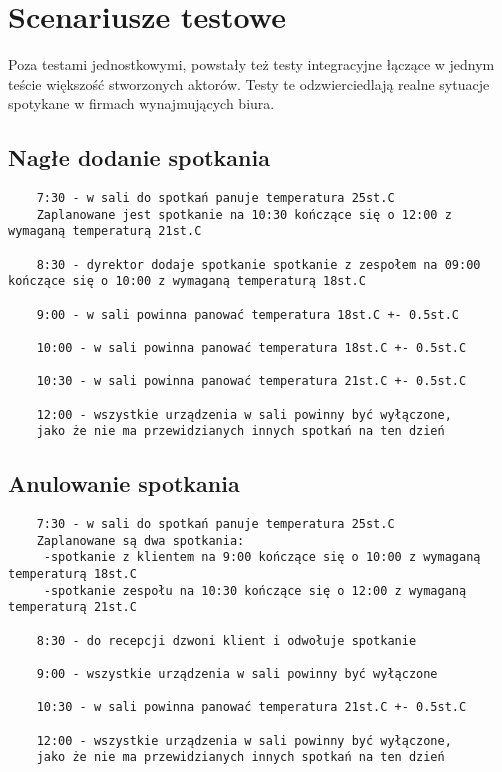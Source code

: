\section{Scenariusze testowe}
Poza testami jednostkowymi, powstały też testy integracyjne łączące w jednym teście większość stworzonych aktorów. Testy te odzwierciedlają realne sytuacje spotykane w firmach wynajmujących biura. 

\subsection{Nagłe dodanie spotkania}
\begin{lstlisting}
    7:30 - w sali do spotkań panuje temperatura 25st.C
    Zaplanowane jest spotkanie na 10:30 kończące się o 12:00 z wymaganą temperaturą 21st.C
    
    8:30 - dyrektor dodaje spotkanie spotkanie z zespołem na 09:00 kończące się o 10:00 z wymaganą temperaturą 18st.C

    9:00 - w sali powinna panować temperatura 18st.C +- 0.5st.C
    
    10:00 - w sali powinna panować temperatura 18st.C +- 0.5st.C
    
    10:30 - w sali powinna panować temperatura 21st.C +- 0.5st.C
    
    12:00 - wszystkie urządzenia w sali powinny być wyłączone, 
    jako że nie ma przewidzianych innych spotkań na ten dzień
\end{lstlisting}

\subsection{Anulowanie spotkania}
\begin{lstlisting}
    7:30 - w sali do spotkań panuje temperatura 25st.C
    Zaplanowane są dwa spotkania:
     -spotkanie z klientem na 9:00 kończące się o 10:00 z wymaganą temperaturą 18st.C    
     -spotkanie zespołu na 10:30 kończące się o 12:00 z wymaganą temperaturą 21st.C
    
    8:30 - do recepcji dzwoni klient i odwołuje spotkanie
    
    9:00 - wszystkie urządzenia w sali powinny być wyłączone

    10:30 - w sali powinna panować temperatura 21st.C +- 0.5st.C

    12:00 - wszystkie urządzenia w sali powinny być wyłączone, 
    jako że nie ma przewidzianych innych spotkań na ten dzień
\end{lstlisting}


